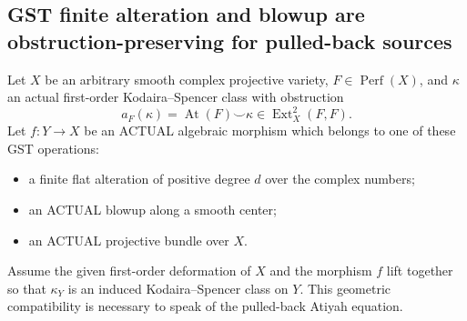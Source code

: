 \documentclass[11pt,a4paper]{article}
\begin{document}
\subsection*{GST finite alteration and blowup are obstruction-preserving for pulled-back sources}
Let \(X\) be
an arbitrary smooth
complex projective
variety, \(F\in
\operatorname{Perf}(X)\),
and \(\kappa\)
an actual first-order
Kodaira--Spencer
class with obstruction
\[
 a_F(\kappa)=
   \operatorname{At}(F)
              \smile\kappa
      \in\operatorname{Ext}^2_X(F,F).
\]
Let \(f:Y\to X\)
be an ACTUAL
algebraic morphism
which belongs
to one of these
GST operations:
\begin{itemize}
 \item a finite flat
  alteration of positive
  degree \(d\)
  over the complex
  numbers;
 \item an ACTUAL blowup
  along a smooth
  center;
 \item an ACTUAL
  projective bundle
  over \(X\).
\end{itemize}
Assume the given
first-order deformation
of \(X\) and
the morphism \(f\)
lift together so
that \(\kappa_Y\)
is an induced
Kodaira--Spencer
class on \(Y\).
This geometric
compatibility is
necessary to
speak of the
pulled-back
Atiyah equation.
\end{document}
